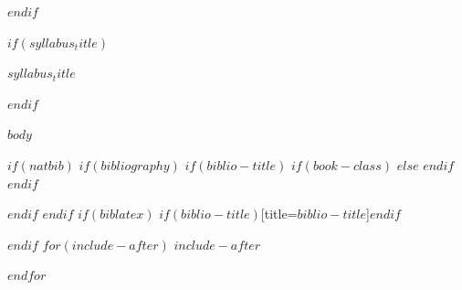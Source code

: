 \documentclass[$if(fontsize)$$fontsize$,$endif$$if(lang)$$babel-lang$,$endif$$if(papersize)$$papersize$,$endif$$for(classoption)$$classoption$$sep$,$endfor$]{article}
\begin{document}
	$endif$
\vspace{2mm}

$if(syllabus_title)$
\begin{center}
\textbf{\Large{\textcolor{unhtext}{$syllabus_title$}}}
\end{center}
 $endif$
  
$body$

$if(natbib)$
$if(bibliography)$
$if(biblio-title)$
$if(book-class)$
\renewcommand\bibname{$biblio-title$}
$else$
\renewcommand\refname{$biblio-title$}
$endif$
$endif$


$endif$
$endif$
$if(biblatex)$
\printbibliography$if(biblio-title)$[title=$biblio-title$]$endif$




$endif$
$for(include-after)$
$include-after$

$endfor$
\end{document}
